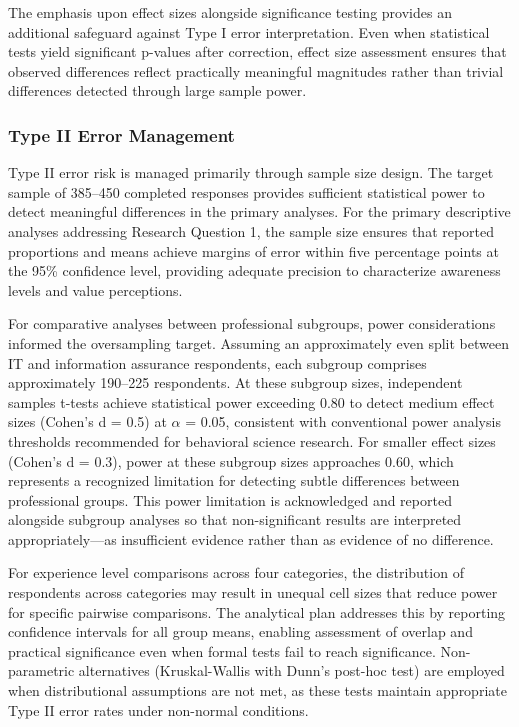 The emphasis upon effect sizes alongside significance testing provides an additional safeguard against Type I error interpretation. Even when statistical tests yield significant p-values after correction, effect size assessment ensures that observed differences reflect practically meaningful magnitudes rather than trivial differences detected through large sample power.

\subsubsection{Type II Error Management}

Type II error risk is managed primarily through sample size design. The target sample of 385--450 completed responses provides sufficient statistical power to detect meaningful differences in the primary analyses. For the primary descriptive analyses addressing Research Question 1, the sample size ensures that reported proportions and means achieve margins of error within five percentage points at the 95\% confidence level, providing adequate precision to characterize awareness levels and value perceptions.

For comparative analyses between professional subgroups, power considerations informed the oversampling target. Assuming an approximately even split between IT and information assurance respondents, each subgroup comprises approximately 190--225 respondents. At these subgroup sizes, independent samples t-tests achieve statistical power exceeding 0.80 to detect medium effect sizes (Cohen's d = 0.5) at \(\alpha\) = 0.05, consistent with conventional power analysis thresholds recommended for behavioral science research. For smaller effect sizes (Cohen's d = 0.3), power at these subgroup sizes approaches 0.60, which represents a recognized limitation for detecting subtle differences between professional groups. This power limitation is acknowledged and reported alongside subgroup analyses so that non-significant results are interpreted appropriately---as insufficient evidence rather than as evidence of no difference.

For experience level comparisons across four categories, the distribution of respondents across categories may result in unequal cell sizes that reduce power for specific pairwise comparisons. The analytical plan addresses this by reporting confidence intervals for all group means, enabling assessment of overlap and practical significance even when formal tests fail to reach significance. Non-parametric alternatives (Kruskal-Wallis with Dunn's post-hoc test) are employed when distributional assumptions are not met, as these tests maintain appropriate Type II error rates under non-normal conditions.


